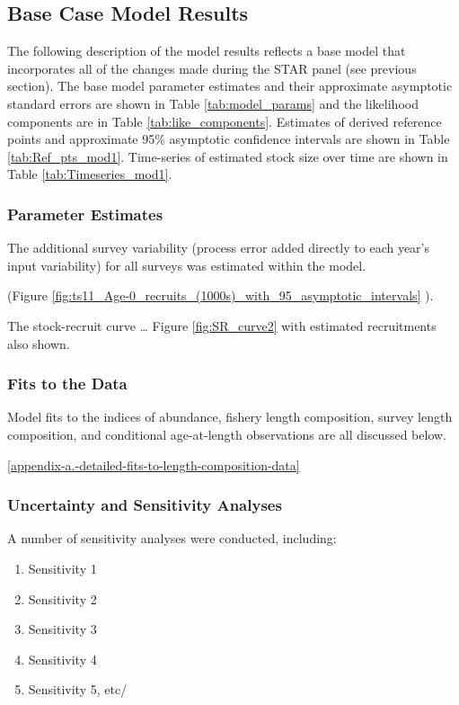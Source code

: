 \documentclass[12pt,]{article}
\begin{document}
\subsection{Base Case Model Results}\label{base-case-model-results}

The following description of the model results reflects a base model
that incorporates all of the changes made during the STAR panel (see
previous section). The base model parameter estimates and their
approximate asymptotic standard errors are shown in Table
\ref{tab:model_params} and the likelihood components are in Table
\ref{tab:like_components}. Estimates of derived reference points and
approximate 95\% asymptotic confidence intervals are shown in Table
\ref{tab:Ref_pts_mod1}. Time-series of estimated stock size over time
are shown in Table \ref{tab:Timeseries_mod1}.

\subsubsection{Parameter Estimates}\label{parameter-estimates}

The additional survey variability (process error added directly to each
year's input variability) for all surveys was estimated within the
model.

(Figure
\ref{fig:ts11_Age-0_recruits_(1000s)_with_95_asymptotic_intervals} ).

The stock-recruit curve \ldots{} Figure \ref{fig:SR_curve2} with
estimated recruitments also shown.

\subsubsection{Fits to the Data}\label{fits-to-the-data}

Model fits to the indices of abundance, fishery length composition,
survey length composition, and conditional age-at-length observations
are all discussed below.

\ref{appendix-a.-detailed-fits-to-length-composition-data}

\subsubsection{Uncertainty and Sensitivity
Analyses}\label{uncertainty-and-sensitivity-analyses}

A number of sensitivity analyses were conducted, including:

\begin{enumerate}

  \item Sensitivity 1
  
  \item Sensitivity 2
  
  \item Sensitivity 3
  
  \item Sensitivity 4
  
  \item Sensitivity 5, etc/
  
  
\end{enumerate}
\end{document}
